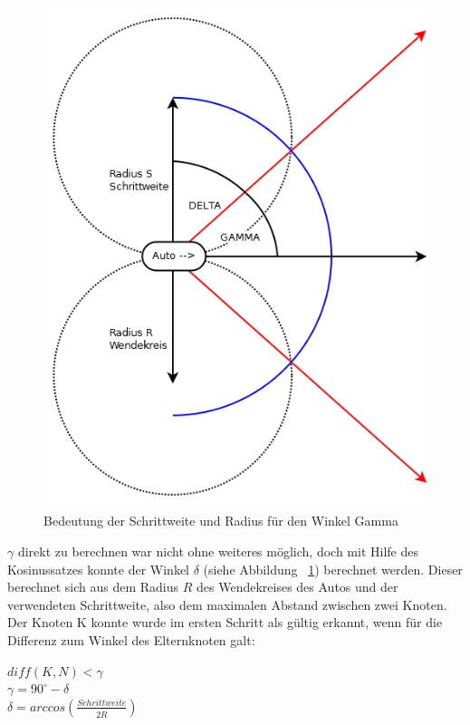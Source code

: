 \begin{figure}
\centering
\label{fig:fig4}
\includegraphics[scale=0.6]{Bilder/AusrichtungGrob.png} 
\caption{Bedeutung der Schrittweite und Radius für den Winkel Gamma}
\end{figure}
 $\gamma$ direkt zu berechnen war nicht ohne weiteres möglich, doch mit Hilfe des Kosinussatzes konnte der Winkel $\delta$ (siehe Abbildung ~\ref{fig:fig4}) berechnet werden. Dieser berechnet sich aus dem Radius $R$ des Wendekreises des Autos und der verwendeten Schrittweite, also dem maximalen Abstand zwischen zwei Knoten. \\
Der Knoten K konnte wurde im ersten Schritt als gültig erkannt, wenn für die Differenz zum Winkel des Elternknoten galt: 
\begin{center}
$diff(K,N) <\gamma$ \\
$\gamma = 90^{\circ} - \delta$  \\
$\delta = arccos (\frac{Schrittweite}{2 \dot R})$  \\
\end{center}

